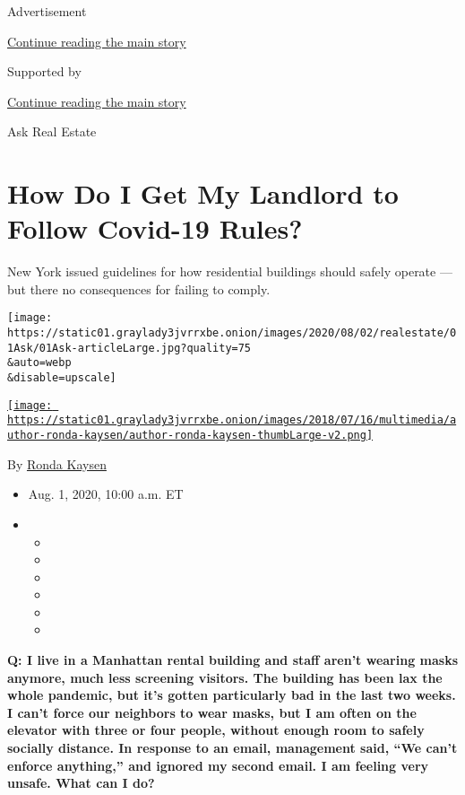 Advertisement

\protect\hyperlink{after-top}{Continue reading the main story}

Supported by

\protect\hyperlink{after-sponsor}{Continue reading the main story}

Ask Real Estate

\hypertarget{how-do-i-get-my-landlord-to-follow-covid-19-rules}{%
\section{How Do I Get My Landlord to Follow Covid-19
Rules?}\label{how-do-i-get-my-landlord-to-follow-covid-19-rules}}

New York issued guidelines for how residential buildings should safely
operate --- but there no consequences for failing to comply.

\texttt{[image: https://static01.graylady3jvrrxbe.onion/images/2020/08/02/realestate/01Ask/01Ask-articleLarge.jpg?quality=75\\\&auto=webp\\\&disable=upscale]}

\href{https://www.nytimes3xbfgragh.onion/by/ronda-kaysen}{\texttt{[image: https://static01.graylady3jvrrxbe.onion/images/2018/07/16/multimedia/author-ronda-kaysen/author-ronda-kaysen-thumbLarge-v2.png]}}

By \href{https://www.nytimes3xbfgragh.onion/by/ronda-kaysen}{Ronda
Kaysen}

\begin{itemize}
\item
  Aug. 1, 2020, 10:00 a.m. ET
\item
  \begin{itemize}
  \item
  \item
  \item
  \item
  \item
  \item
  \end{itemize}
\end{itemize}

\textbf{Q: I live in a Manhattan rental building and staff aren't
wearing masks anymore, much less screening visitors. The building has
been lax the whole pandemic, but it's gotten particularly bad in the
last two weeks. I can't force our neighbors to wear masks, but I am
often on the elevator with three or four people, without enough room to
safely socially distance. In response to an email, management said, ``We
can't enforce anything,'' and ignored my second email. I am feeling very
unsafe. What can I do?}

